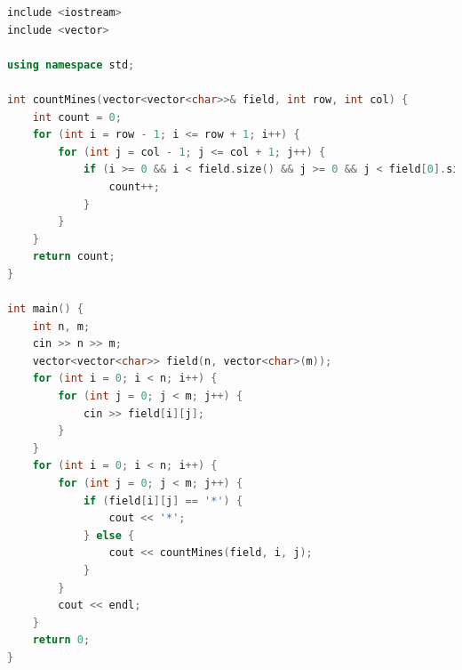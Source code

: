 \documentclass[12pt,twiside,a4paper]{ctexbook}
\numberwithin{chapter}{part}
\begin{document}
\begin{lstlisting}[language=c++]
include <iostream>
include <vector>

using namespace std;

int countMines(vector<vector<char>>& field, int row, int col) {
    int count = 0;
    for (int i = row - 1; i <= row + 1; i++) {
        for (int j = col - 1; j <= col + 1; j++) {
            if (i >= 0 && i < field.size() && j >= 0 && j < field[0].size() && field[i][j] == '*') {
                count++;
            }
        }
    }
    return count;
}

int main() {
    int n, m;
    cin >> n >> m;
    vector<vector<char>> field(n, vector<char>(m));
    for (int i = 0; i < n; i++) {
        for (int j = 0; j < m; j++) {
            cin >> field[i][j];
        }
    }
    for (int i = 0; i < n; i++) {
        for (int j = 0; j < m; j++) {
            if (field[i][j] == '*') {
                cout << '*';
            } else {
                cout << countMines(field, i, j);
            }
        }
        cout << endl;
    }
    return 0;
}
\end{lstlisting}
\end{document}
